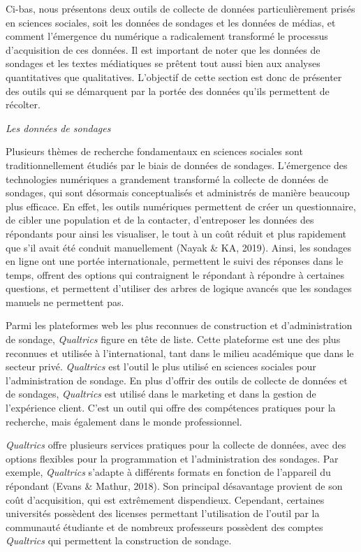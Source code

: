 \documentclass[
  letterpaper,
  DIV=11,
  numbers=noendperiod,
  oneside]{scrreprt}
\begin{document}
Ci-bas, nous présentons deux outils de collecte de données
particulièrement prisés en sciences sociales, soit les données de
sondages et les données de médias, et comment l'émergence du numérique a
radicalement transformé le processus d'acquisition de ces données. Il
est important de noter que les données de sondages et les textes
médiatiques se prêtent tout aussi bien aux analyses quantitatives que
qualitatives. L'objectif de cette section est donc de présenter des
outils qui se démarquent par la portée des données qu'ils permettent de
récolter.

\emph{Les données de sondages}

Plusieurs thèmes de recherche fondamentaux en sciences sociales sont
traditionnellement étudiés par le biais de données de sondages.
L'émergence des technologies numériques a grandement transformé la
collecte de données de sondages, qui sont désormais conceptualisés et
administrés de manière beaucoup plus efficace. En effet, les outils
numériques permettent de créer un questionnaire, de cibler une
population et de la contacter, d'entreposer les données des répondants
pour ainsi les visualiser, le tout à un coût réduit et plus rapidement
que s'il avait été conduit manuellement (Nayak \& KA, 2019). Ainsi, les
sondages en ligne ont une portée internationale, permettent le suivi des
réponses dans le temps, offrent des options qui contraignent le
répondant à répondre à certaines questions, et permettent d'utiliser des
arbres de logique avancés que les sondages manuels ne permettent pas.

Parmi les plateformes web les plus reconnues de construction et
d'administration de sondage, \emph{Qualtrics} figure en tête de liste.
Cette plateforme est une des plus reconnues et utilisée à
l'international, tant dans le milieu académique que dans le secteur
privé. \emph{Qualtrics} est l'outil le plus utilisé en sciences sociales
pour l'administration de sondage. En plus d'offrir des outils de
collecte de données et de sondages, \emph{Qualtrics} est utilisé dans le
marketing et dans la gestion de l'expérience client. C'est un outil qui
offre des compétences pratiques pour la recherche, mais également dans
le monde professionnel.

\emph{Qualtrics} offre plusieurs services pratiques pour la collecte de
données, avec des options flexibles pour la programmation et
l'administration des sondages. Par exemple, \emph{Qualtrics} s'adapte à
différents formats en fonction de l'appareil du répondant (Evans \&
Mathur, 2018). Son principal désavantage provient de son coût
d'acquisition, qui est extrêmement dispendieux. Cependant, certaines
universités possèdent des licenses permettant l'utilisation de l'outil
par la communauté étudiante et de nombreux professeurs possèdent des
comptes \emph{Qualtrics} qui permettent la construction de sondage.
\end{document}
